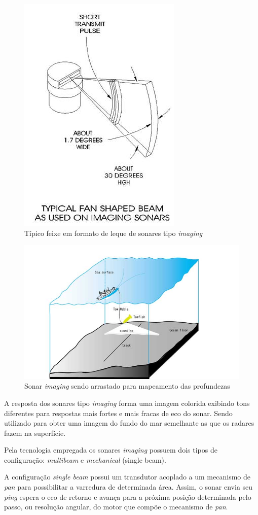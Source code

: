 \begin{figure}[H]
    \centering
    \includegraphics[width=0.5\columnwidth]{figs/sonar/1.jpg}
    \caption{Típico feixe em formato de leque de sonares tipo \emph{imaging}}
    \label{sonar_1}
\end{figure}

\begin{figure}[H]
    \centering
    \includegraphics[width=0.5\columnwidth]{figs/sonar/2.jpg}
    \caption{Sonar \emph{imaging} sendo arrastado para mapeamento das profundezas}
    \label{sonar_2}
\end{figure}


A resposta dos sonares tipo \emph{imaging} forma uma imagem colorida exibindo tons diferentes para respostas mais fortes e mais fracas de eco do sonar. Sendo utilizado para obter uma imagem do fundo do mar semelhante as que os radares fazem na superfície.

Pela tecnologia empregada os sonares \emph{imaging} possuem dois tipos de configuração: \emph{multibeam} e \emph{mechanical} (single beam).

A configuração \emph{single beam} possui um transdutor acoplado a um mecanismo de \emph{pan} para possibilitar a varredura de determinada área. Assim, o sonar envia seu \emph{ping} espera o eco de retorno e avança para a próxima posição determinada pelo passo, ou resolução angular, do motor que compõe o mecanismo de \emph{pan}.

